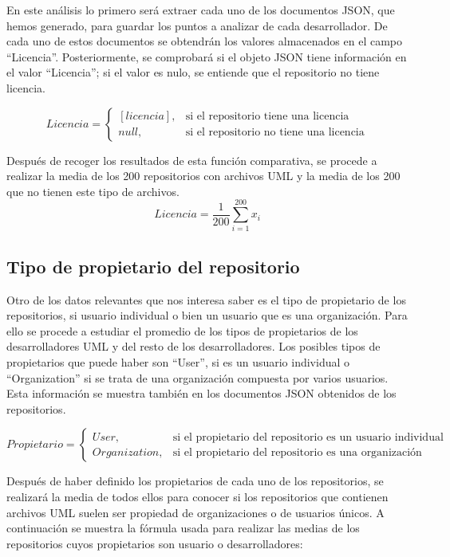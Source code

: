 \documentclass[a4paper, 12pt]{book}
\begin{document}
En este análisis lo primero será extraer cada uno de los documentos JSON, que hemos generado, para guardar los puntos a analizar de cada desarrollador.
De cada uno de estos documentos se obtendrán los valores almacenados en el campo ``Licencia''.
Posteriormente, se comprobará si el objeto JSON tiene información en el valor ``Licencia''; si el valor es nulo, se entiende que el repositorio no tiene licencia.


\begin{equation}
  Licencia =
  \begin{cases}
  [licencia], & \text{si el repositorio tiene una licencia} \\
  null, & \text{si el repositorio no tiene una licencia}
  \end{cases}
\end{equation}

Después de recoger los resultados de esta función comparativa, se procede a realizar la media de los 200 repositorios con archivos UML y la media de los 200 que no tienen este tipo de archivos.
\[{Licencia} = \frac{1}{200} \sum_{i=1}^{200} x_i\]


\subsection{Tipo de propietario del repositorio} %
\label{sec:tipo de propietario del repositorio}

Otro de los datos relevantes que nos interesa saber es el tipo de propietario de los repositorios, si usuario individual o bien un usuario que es una organización. 
Para ello se procede a estudiar el promedio de los tipos de propietarios de los desarrolladores UML y del resto de los desarrolladores.
Los posibles tipos de propietarios que puede haber son ``User'', si es un usuario individual o ``Organization'' si se trata de una organización compuesta por varios usuarios.
Esta información se muestra también en los documentos JSON obtenidos de los repositorios.

\begin{equation}
  Propietario =
  \begin{cases}
  User, & \text{si el propietario del repositorio es un usuario individual} \\
  Organization, & \text{si el propietario del repositorio es una organización}
  \end{cases}
\end{equation}

Después de haber definido los propietarios de cada uno de los repositorios, se realizará la media de todos ellos para conocer si los repositorios que contienen archivos UML suelen ser propiedad de organizaciones o de usuarios únicos.
A continuación se muestra la fórmula usada para realizar las medias de los repositorios cuyos propietarios son usuario o desarrolladores:
\end{document}
